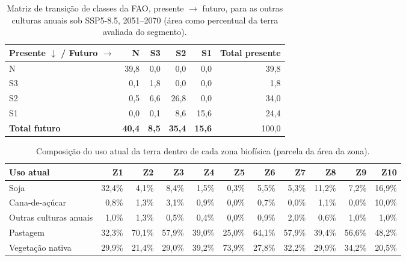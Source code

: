 \begin{table}[H]
\centering
\caption{Matriz de transição de classes da FAO, presente $\rightarrow$ futuro, para as
outras culturas anuais sob SSP5-8.5, 2051--2070 (área como percentual da terra avaliada do
segmento).}
\label{tab:transition-othercrops}
\begin{tabular}{@{}lrrrrr@{}}
\toprule
Presente $\downarrow$ / Futuro $\rightarrow$ & N & S3 & S2 & S1 & Total presente \\
\midrule
N   & 39,8 & 0,0 & 0,0  & 0,0  & 39,8 \\
S3  & 0,1  & 1,8 & 0,0  & 0,0  & 1,8 \\
S2  & 0,5  & 6,6 & 26,8 & 0,0  & 34,0 \\
S1  & 0,0  & 0,1 & 8,6  & 15,6 & 24,4 \\
\midrule
\textbf{Total futuro} & \textbf{40,4} & \textbf{8,5} & \textbf{35,4} & \textbf{15,6} & 100,0 \\
\bottomrule
\end{tabular}
\end{table}

\begin{table}[H]
\centering
\caption{Composição do uso atual da terra dentro de cada zona biofísica (parcela da área da
zona).}
\label{tab:zone-realized}
\scriptsize
\begin{tabular}{@{}lrrrrrrrrrr@{}}
\toprule
Uso atual & Z1 & Z2 & Z3 & Z4 & Z5 & Z6 & Z7 & Z8 & Z9 & Z10 \\
\midrule
Soja                 & 32,4\% & 4,1\% & 8,4\% & 1,5\% & 0,3\% & 5,5\% & 5,3\% & 11,2\% & 7,2\% & 16,9\% \\
Cana-de-açúcar       & 0,8\%  & 1,3\% & 3,1\% & 0,9\% & 0,0\% & 0,7\% & 0,0\% & 1,1\%  & 0,0\% & 10,0\% \\
Outras culturas anuais & 1,0\%  & 1,3\% & 0,5\% & 0,4\% & 0,0\% & 0,9\% & 2,0\% & 0,6\%  & 1,0\% & 1,0\% \\
Pastagem             & 32,3\% & 70,1\% & 57,9\% & 39,0\% & 25,0\% & 64,1\% & 57,9\% & 39,4\% & 56,6\% & 48,2\% \\
Vegetação nativa     & 29,9\% & 21,4\% & 29,0\% & 39,2\% & 73,9\% & 27,8\% & 32,2\% & 29,9\% & 34,2\% & 20,5\% \\
\bottomrule
\end{tabular}
\end{table}


